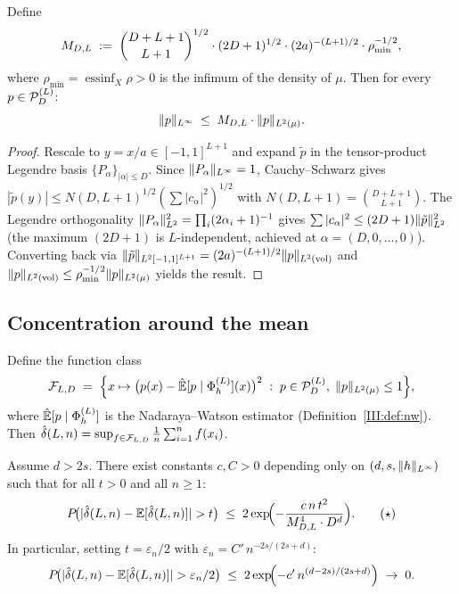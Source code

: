 \begin{lemma}
\label{III:lem:bounded}
Define
\[
  M_{D,L} \;:=\;
  \binom{D+L+1}{L+1}^{1/2}
  \cdot (2D+1)^{1/2}
  \cdot (2a)^{-(L+1)/2}
  \cdot \rho_{\min}^{-1/2},
\]
where $\rho_{\min} = \operatorname{essinf}_X \rho > 0$ is the infimum of
the density of $\mu$.
Then for every $p \in \mathcal{P}_D^{(L)}$:
\[
  \|p\|_{L^{\infty}} \;\leq\; M_{D,L} \cdot \|p\|_{L^{2}(\mu)}.
\]
\end{lemma}

\begin{proof}
Rescale to $y = x/a \in [-1,1]^{L+1}$ and expand $\tilde p$ in the
tensor-product Legendre basis $\{P_\alpha\}_{|\alpha|\leq D}$.
Since $\|P_\alpha\|_{L^{\infty}} = 1$, Cauchy--Schwarz gives
$|\tilde p(y)| \leq N(D,L+1)^{1/2}(\sum|c_\alpha|^2)^{1/2}$
with $N(D,L+1) = \binom{D+L+1}{L+1}$.
The Legendre orthogonality $\|P_\alpha\|_{L^{2}}^2 = \prod_i(2\alpha_i+1)^{-1}$
gives $\sum|c_\alpha|^2 \leq (2D+1)\|\tilde p\|_{L^{2}}^2$ (the
maximum $(2D+1)$ is $L$-independent, achieved at $\alpha=(D,0,\ldots,0)$).
Converting back via
$\|\tilde p\|_{L^{2}[-1,1]^{L+1}} = (2a)^{-(L+1)/2}\|p\|_{L^{2}(\mathrm{vol})}$
and $\|p\|_{L^{2}(\mathrm{vol})} \leq \rho_{\min}^{-1/2}\|p\|_{L^{2}(\mu)}$
yields the result.
\end{proof}

\subsection{Concentration around the mean}
\label{III:subsec:mcdiarmiid}

Define the function class
\[
  \mathcal{F}_{L,D}
  \;=\;
  \Bigl\{x \mapsto \bigl(p(x) - \hat{\mathbb{E}}[p \mid \Phi_h^{(L)}](x)\bigr)^2
    \;:\; p \in \mathcal{P}_D^{(L)},\; \|p\|_{L^{2}(\mu)} \leq 1\Bigr\},
\]
where $\hat{\mathbb{E}}[p \mid \Phi_h^{(L)}]$ is the Nadaraya--Watson estimator
(Definition~\ref{III:def:nw}).
Then $\hat{\delta}(L,n) = \sup_{f \in \mathcal{F}_{L,D}} \frac{1}{n}\sum_{i=1}^n f(x_i)$.

\begin{proposition}
\label{III:prop:concentration}
Assume $d > 2s$.
There exist constants $c, C > 0$ depending only on $(d, s, \|h\|_{L^{\infty}})$
such that for all $t > 0$ and all $n \geq 1$:
\[
  P\!\bigl(|\hat{\delta}(L,n) - \mathbb{E}[\hat{\delta}(L,n)]| > t\bigr)
  \;\leq\;
  2\exp\!\Bigl(-\frac{c\,n\,t^2}{M_{D,L}^4 \cdot D^d}\Bigr).
  \tag{$\star$}
\]
In particular, setting $t = \varepsilon_n/2$ with
$\varepsilon_n = C'\,n^{-2s/(2s+d)}$:
\[
  P\!\bigl(|\hat{\delta}(L,n) - \mathbb{E}[\hat{\delta}(L,n)]| > \varepsilon_n/2\bigr)
  \;\leq\;
  2\exp\!\Bigl(-c'\,n^{(d-2s)/(2s+d)}\Bigr)
  \;\to\; 0.
\]
\end{proposition}

